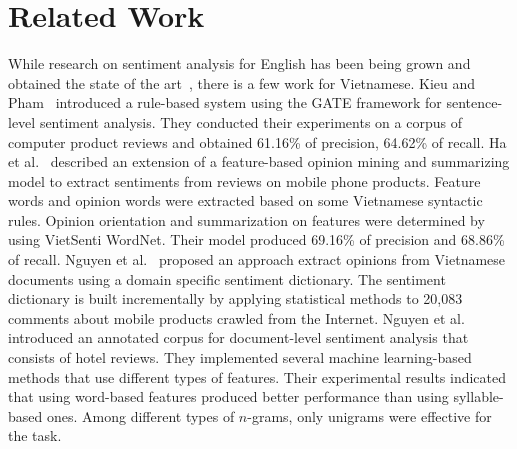 \documentclass[conference,compsoc]{IEEEtran}
\begin{document}
\section{Related Work}
\label{related}

While research on sentiment analysis for English has been being grown and obtained the state of the art~\cite{Tong2001,Pang02thumbsup,sentiment_kiritchenko,Ganu_beyondthe,SocherEtAl2011:RAE}, there is a few work for Vietnamese. 
Kieu and Pham~\cite{Kieu_2010} introduced a rule-based system using the GATE framework for sentence-level sentiment analysis. They conducted their experiments on a corpus of computer product reviews and obtained 61.16\% of precision, 64.62\% of recall.
Ha et al.~\cite{Ha_2011} described an extension of a feature-based opinion mining and summarizing model to extract sentiments from reviews on mobile phone products. 
Feature words and opinion words were extracted based on some Vietnamese syntactic rules. Opinion orientation and summarization on features were determined by using VietSenti WordNet.
Their model produced 69.16\% of precision and 68.86\% of recall.
Nguyen et al.~\cite{Hong_2014} proposed an approach extract opinions from Vietnamese documents using a domain specific sentiment dictionary. 
The sentiment dictionary is built incrementally by applying statistical methods to 20,083 comments about mobile products crawled from the Internet. 
Nguyen et al.~\cite{Duyen_2014} introduced an annotated corpus for document-level sentiment analysis that consists of hotel reviews. They implemented several machine learning-based methods that use different types of features. Their experimental results indicated that using word-based features produced better performance than using syllable-based ones. Among different types of $n$-grams, only unigrams were effective for the task.
\end{document}
